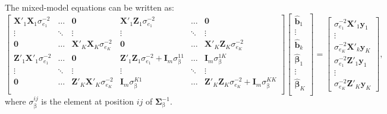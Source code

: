 \documentclass{bmcart}
\begin{document}
The mixed-model equations can be written as:
\begin{equation}\nonumber
\label{eqn:MME}
\begin{bmatrix}
\mathbf{X}'_1\mathbf{X}_1\sigma^{-2}_{e_1} & \hdots & \mathbf{0} & \mathbf{X}'_1\mathbf{Z}_1\sigma^{-2}_{e_1} & \hdots & \mathbf{0}\\
\vdots & \ddots & \vdots & \vdots & \ddots & \vdots\\
\mathbf{0} & \hdots & \mathbf{X}'_K\mathbf{X}_K\sigma^{-2}_{e_K} & \mathbf{0} & \hdots & \mathbf{X}'_K\mathbf{Z}_K\sigma^{-2}_{e_K}\\
\mathbf{Z}'_1\mathbf{X}'_1\sigma^{-2}_{e_1} & \hdots & \mathbf{0} & \mathbf{Z}'_1\mathbf{Z}_1\sigma^{-2}_{e_1}+\mathbf{I}_m\sigma^{11}_{\upbeta} & \hdots & \mathbf{I}_m\sigma^{1K}_{\upbeta}\\
\vdots & \ddots & \vdots & \vdots & \ddots & \vdots\\
\mathbf{0} & \hdots & \mathbf{Z}'_K\mathbf{X}'_K\sigma^{-2}_{e_K} & \mathbf{I}_m\sigma^{K1}_{\upbeta} & \hdots & \mathbf{Z}'_K\mathbf{Z}_K\sigma^{-2}_{e_K}+\mathbf{I}_m\sigma^{KK}_{\upbeta}\\
\end{bmatrix}
\begin{bmatrix}
\hat{\mathbf{b}}_1\\
\vdots\\
\hat{\mathbf{b}}_k\\
\hat{\mathbf{\upbeta}}_1\\
\vdots\\
\hat{\mathbf{\upbeta}}_K\\
\end{bmatrix}
=
\begin{bmatrix}
\sigma^{-2}_{e_1}\mathbf{X}'_1\mathbf{y}_1\\
\vdots\\
\sigma^{-2}_{e_K}\mathbf{X}'_k\mathbf{y}_K\\
\sigma^{-2}_{e_1}\mathbf{Z}'_1\mathbf{y}_1\\
\vdots\\
\sigma^{-2}_{e_K}\mathbf{Z}'_K\mathbf{y}_K
\end{bmatrix},
\end{equation}
where $\sigma^{ij}_{\upbeta}$ is the element at position $ij$ of $\mathbf{\Sigma}^{-1}_{\upbeta}$.
\end{document}
